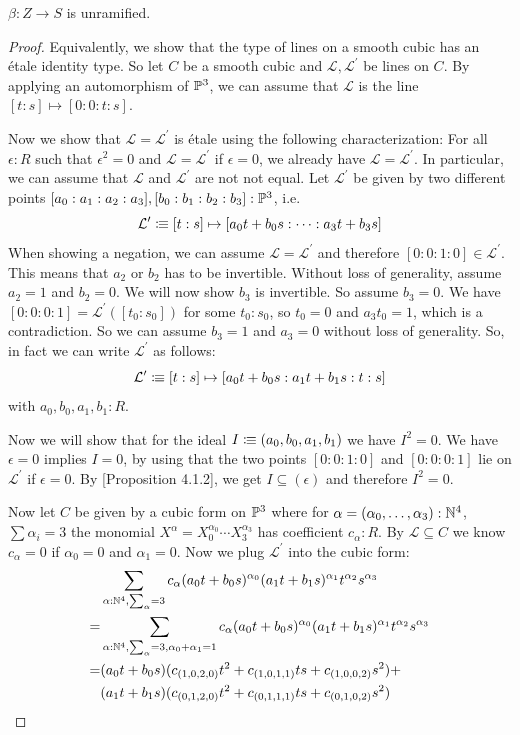 \begin{lemma}
  \label{beta-unramified}
  \(\beta:Z\to S\) is unramified.
\end{lemma}

\begin{proof}
  Equivalently, we show that the type of lines on a smooth cubic has an étale identity type.
  So let \(C\) be a smooth cubic and \(\mathcal L,\mathcal L^\prime\) be lines on \(C\). By applying an automorphism of \(\mathbb{P}^3\),
  we can assume that \(\mathcal L\) is the line \([t:s]\mapsto [0:0:t:s]\).
  
  Now we show that \(\mathcal L=\mathcal L^\prime\) is étale using the following characterization: For all \(\epsilon:R\) such that \(\epsilon^2=0\) and \(\mathcal L=\mathcal L^\prime\) if \(\epsilon=0\), we already have \(\mathcal L=\mathcal L^\prime\).
  In particular, we can assume that \(\mathcal L\) and \(\mathcal L^\prime\) are not not equal.
  Let \(\mathcal L^\prime\) be given by two different points \([a_0:a_1:a_2:a_3],[b_0:b_1:b_2:b_3]:\mathbb{P}^3\), i.e.\ \[
    \mathcal L^\prime\vcentcolon\mspace{-1.2mu}\equiv[t:s]\mapsto [a_0t+b_0s:\dots : a_3t+b_3s]
  \]
  When showing a negation, we can assume \(\mathcal L=\mathcal L^\prime\) and therefore
  \([0:0:1:0]\in\mathcal L^\prime\).
  This means that \(a_2\) or \(b_2\) has to be invertible.
  Without loss of generality, assume \(a_2=1\) and \(b_2=0\).
  We will now show \(b_3\) is invertible. So assume \(b_3=0\).
  We have \([0:0:0:1]=\mathcal L^\prime([t_0:s_0])\) for some \(t_0:s_0\),
  so \(t_0=0\) and \(a_3t_0=1\), which is a contradiction.
  So we can assume  \(b_3=1\) and \(a_3=0\) without loss of generality.
  So, in fact we can write \(\mathcal L^\prime\) as follows:
  \[
    \mathcal L^\prime\vcentcolon\mspace{-1.2mu}\equiv[t:s]\mapsto [a_0t+b_0 s:a_1 t+b_1 s : t : s]
  \]
  with \(a_0,b_0,a_1,b_1:R\).

  Now we will show that for the ideal \(I\vcentcolon\mspace{-1.2mu}\equiv(a_0,b_0,a_1,b_1) \) we have \(I^2=0\).
  We have \(\epsilon=0\) implies \(I=0 \), by using that the two points \([0:0:1:0]\) and \([0:0:0:1]\) lie on \(\mathcal L^\prime\) if \(\epsilon=0\). By \cite{draft}[Proposition 4.1.2], we get \(I\subseteq (\epsilon)\) and therefore \(I^2=0\).

  Now let \(C\) be given by a cubic form on \(\mathbb{P}^3\) where for \(\alpha=(\alpha_0,\dots,\alpha_3):\mathbb{N}^4\), \(\sum\alpha_i=3\) the monomial \(X^\alpha=X_0^{\alpha_0}\cdots X_3^{\alpha_3}\) has coefficient \(c_\alpha:R\).
  By \(\mathcal L\subseteq C\) we know \(c_\alpha=0\) if \(\alpha_0=0\) and \(\alpha_1=0\).
  Now we plug \(\mathcal L^\prime\) into the cubic form:
  \begin{align*}
    &\sum_{\alpha:\mathbb{N}^4, \sum_\alpha=3}c_\alpha (a_0t+b_0s)^{\alpha_0}(a_1t+b_1s)^{\alpha_1}t^{\alpha_2}s^{\alpha_3}\\
    =&\sum_{\alpha:\mathbb{N}^4, \sum_\alpha=3,\alpha_0+\alpha_1=1}c_\alpha (a_0t+b_0s)^{\alpha_0}(a_1t+b_1s)^{\alpha_1}t^{\alpha_2}s^{\alpha_3} \\
    =& (a_0t+b_0s)(c_{(1,0,2,0)}t^2+c_{(1,0,1,1)}ts+c_{(1,0,0,2)}s^2)+ \\
      &(a_1t+b_1s)(c_{(0,1,2,0)}t^2+c_{(0,1,1,1)}ts+c_{(0,1,0,2)}s^2)
  \end{align*}


\end{proof}
